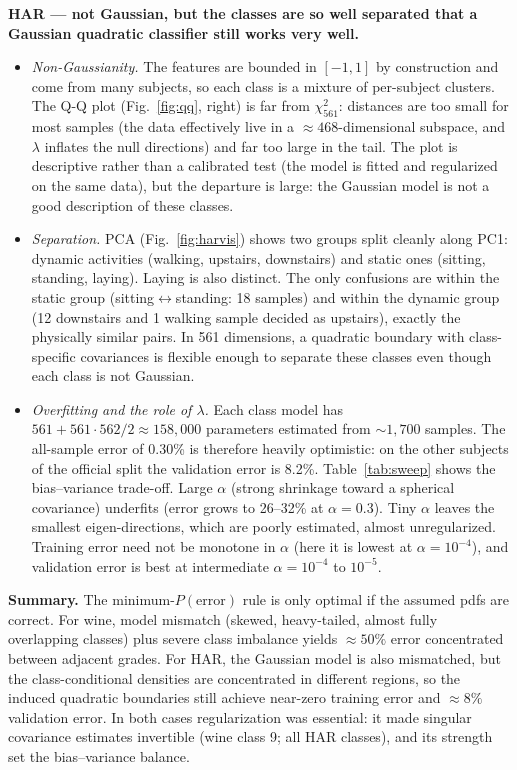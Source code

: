 \documentclass[10pt]{article}
\begin{document}
\textbf{HAR --- not Gaussian, but the classes are so well separated that a Gaussian quadratic classifier still works very well.}
\begin{itemize}
\item \emph{Non-Gaussianity.} The features are bounded in $[-1,1]$ by construction and come from many subjects, so each class is a mixture of per-subject clusters. The Q-Q plot (Fig.~\ref{fig:qq}, right) is far from $\chi^2_{561}$: distances are too small for most samples (the data effectively live in a $\approx468$-dimensional subspace, and $\lambda$ inflates the null directions) and far too large in the tail. The plot is descriptive rather than a calibrated test (the model is fitted and regularized on the same data), but the departure is large: the Gaussian model is not a good description of these classes.
\item \emph{Separation.} PCA (Fig.~\ref{fig:harvis}) shows two groups split cleanly along PC1: dynamic activities (walking, upstairs, downstairs) and static ones (sitting, standing, laying). Laying is also distinct. The only confusions are within the static group (sitting$\leftrightarrow$standing: 18 samples) and within the dynamic group (12 downstairs and 1 walking sample decided as upstairs), exactly the physically similar pairs. In 561 dimensions, a quadratic boundary with class-specific covariances is flexible enough to separate these classes even though each class is not Gaussian.
\item \emph{Overfitting and the role of $\lambda$.} Each class model has $561+561\cdot562/2\approx158{,}000$ parameters estimated from $\sim1{,}700$ samples. The all-sample error of 0.30\% is therefore heavily optimistic: on the other subjects of the official split the validation error is 8.2\%. Table~\ref{tab:sweep} shows the bias--variance trade-off. Large $\alpha$ (strong shrinkage toward a spherical covariance) underfits (error grows to 26--32\% at $\alpha=0.3$). Tiny $\alpha$ leaves the smallest eigen-directions, which are poorly estimated, almost unregularized. Training error need not be monotone in $\alpha$ (here it is lowest at $\alpha=10^{-4}$), and validation error is best at intermediate $\alpha=10^{-4}$ to $10^{-5}$.
\end{itemize}

\textbf{Summary.} The minimum-$P(\text{error})$ rule is only optimal if the assumed pdfs are correct. For wine, model mismatch (skewed, heavy-tailed, almost fully overlapping classes) plus severe class imbalance yields $\approx50\%$ error concentrated between adjacent grades. For HAR, the Gaussian model is also mismatched, but the class-conditional densities are concentrated in different regions, so the induced quadratic boundaries still achieve near-zero training error and $\approx8\%$ validation error. In both cases regularization was essential: it made singular covariance estimates invertible (wine class 9; all HAR classes), and its strength set the bias--variance balance.
\end{document}
